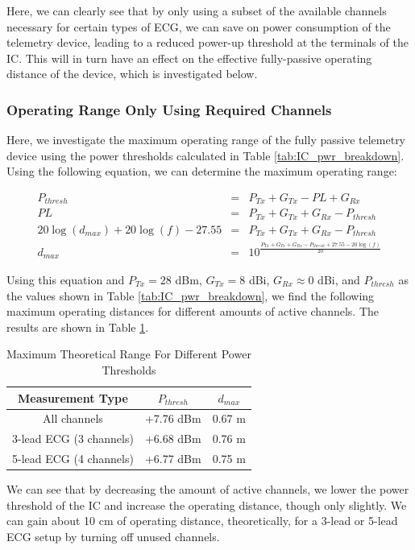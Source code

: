 \documentclass[12pt,onecolumn,titlepage]{article}
\begin{document}
Here, we can clearly see that by only using a subset of the available channels necessary for certain types of ECG, we can save on power consumption of the telemetry device, leading to a reduced power-up threshold at the terminals of the IC. This will in turn have an effect on the effective fully-passive operating distance of the device, which is investigated below.

\subsubsection{Operating Range Only Using Required Channels}
\indent \indent Here, we investigate the maximum operating range of the fully passive telemetry device using the power thresholds calculated in Table \ref{tab:IC_pwr_breakdown}. Using the following equation, we can determine the maximum operating range:

\begin{eqnarray}
P_{thresh} &=& P_{Tx}+G_{Tx}-PL+G_{Rx}  \\
PL &=& P_{Tx}+G_{Tx}+G_{Rx}-P_{thresh} \\
20\log(d_{max})+20\log(f)-27.55 &=& P_{Tx}+G_{Tx}+G_{Rx}-P_{thresh} \\
d_{max} &=& 10^{\frac{P_{Tx}+G_{Tx}+G_{Rx}-P_{thresh}+27.55-20\log(f)}{20}}
\end{eqnarray}

Using this equation and $P_{Tx}=28$ dBm, $G_{Tx}=8$ dBi, $G_{Rx}\approx0$ dBi, and $P_{thresh}$ as the values shown in Table \ref{tab:IC_pwr_breakdown}, we find the following maximum operating distances for different amounts of active channels. The results are shown in Table \ref{tab:max_op_dist}.

\begin{table}[h]
\centering
	\caption{Maximum Theoretical Range For Different Power Thresholds}
	\begin{tabular}{| c | c | c |}
	\hline
	{\bf{Measurement Type}} & $P_{thresh}$ & $d_{max}$ \\ \hline
	All channels & +7.76 dBm & 0.67 m \\ \hline
	3-lead ECG (3 channels) & +6.68 dBm & 0.76 m \\ \hline
	5-lead ECG (4 channels) & +6.77 dBm & 0.75 m \\ \hline
	\end{tabular}
\label{tab:max_op_dist}
\end{table}

We can see that by decreasing the amount of active channels, we lower the power threshold of the IC and increase the operating distance, though only slightly. We can gain about 10 cm of operating distance, theoretically, for a 3-lead or 5-lead ECG setup by turning off unused channels.
\end{document}
